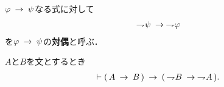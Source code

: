 	$\varphi \rarrow \psi$なる式に対して
	\begin{align}
		\negation \psi \rarrow \negation \varphi
	\end{align}
	を$\varphi \rarrow \psi$の{\bf 対偶}と呼ぶ．
	
	\begin{screen}
		\begin{logicalthm}[対偶命題が導かれる]
		\label{logicalthm:introduction_of_contraposition}
			$A$と$B$を文とするとき
			\begin{align}
				\vdash (\, A \rarrow B\, ) 
				\rarrow (\, \negation B \rarrow \negation A\, ).
			\end{align}
		\end{logicalthm}
	\end{screen}
	
